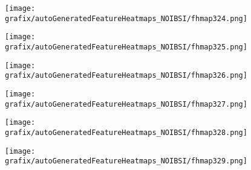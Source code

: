 \hspace{\hsp} 
\begin{subfigure}{\wid\textwidth} 
    \centering 
    \caption{\tiny \sffamily {}} 
    \vspace{\vsp} 
    \texttt{[image: grafix/autoGeneratedFeatureHeatmaps\_NOIBSI/fhmap324.png]} 
\end{subfigure} 
\hspace{\hsp} 
\begin{subfigure}{\wid\textwidth} 
    \centering 
    \caption{\tiny \sffamily {}} 
    \vspace{\vsp} 
    \texttt{[image: grafix/autoGeneratedFeatureHeatmaps\_NOIBSI/fhmap325.png]} 
\end{subfigure} 
\hspace{\hsp} 
\begin{subfigure}{\wid\textwidth} 
    \centering 
    \caption{\tiny \sffamily {}} 
    \vspace{\vsp} 
    \texttt{[image: grafix/autoGeneratedFeatureHeatmaps\_NOIBSI/fhmap326.png]} 
\end{subfigure} 
\hspace{\hsp} 
\begin{subfigure}{\wid\textwidth} 
    \centering 
    \caption{\tiny \sffamily {}} 
    \vspace{\vsp} 
    \texttt{[image: grafix/autoGeneratedFeatureHeatmaps\_NOIBSI/fhmap327.png]} 
\end{subfigure} 
\hspace{\hsp} 
\begin{subfigure}{\wid\textwidth} 
    \centering 
    \caption{\tiny \sffamily {}} 
    \vspace{\vsp} 
    \texttt{[image: grafix/autoGeneratedFeatureHeatmaps\_NOIBSI/fhmap328.png]} 
\end{subfigure} 
\hspace{\hsp} 
\begin{subfigure}{\wid\textwidth} 
    \centering 
    \caption{\tiny \sffamily {}} 
    \vspace{\vsp} 
    \texttt{[image: grafix/autoGeneratedFeatureHeatmaps\_NOIBSI/fhmap329.png]} 
\end{subfigure} 
\hspace{\hsp} 

